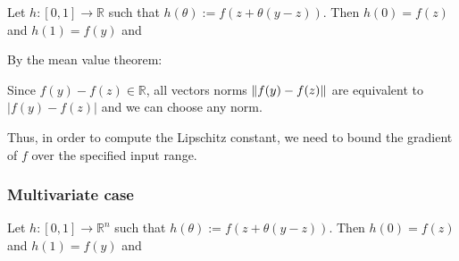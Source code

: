 Let $h: [0, 1] \to \mathbb{R}$ such that $h(\theta) := f(z + \theta(y-z))$.
Then $h(0) = f(z)$ and $h(1) = f(y)$ and

By the mean value theorem:




Since $f(y) - f(z) \in \mathbb{R}$, all vectors norms $\lVert f(y) - f(z) \rVert$
are equivalent to $|f(y) - f(z)|$ and we can choose any norm.


Thus, in order to compute the Lipschitz constant, we need to bound the gradient of $f$
over the specified input range.



\subsubsection{Multivariate case}
Let $h: [0, 1] \to \mathbb{R}^n$ such that $h(\theta) := f(z + \theta(y-z))$.
Then $h(0) = f(z)$ and $h(1) = f(y)$ and

